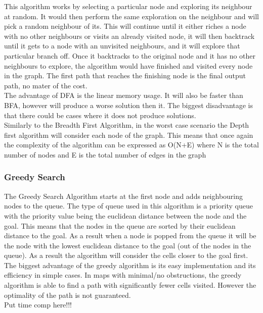 \documentclass[a4paper,12pt]{article}
\begin{document}
				This algorithm works by selecting a particular node and exploring its neighbour at random. It 
				would then perform the same exploration on the neighbour and will pick a random neighbour of its. 
				This will continue until it either riches a node with no other neighbours or visits an already 
				visited node, it will then backtrack until it gets to a node with an unvisited neighbours, and 
				it will explore that particular branch off. Once it backtracks to the original node and it has 
				no other neighbours to explore, the algorithm would have finished and visited every node in the 
				graph. The first path that reaches the finishing node is the final output path, no mater of the 
				cost. 
				\\
				The advantage of DFA is the linear memory usage. It will also be faster than BFA, however will
				produce a worse solution then it.  The biggest disadvantage is that there could be cases where 
				it does not produce solutions. 
				\\
				Similarly to the Breadth First Algorithm, in the worst case scenario the Depth first algorithm
				will consider each node of the graph. This means that once again the complexity of the algorithm
				can be expressed as O(N+E) where N is the total number of nodes and E is the total number of edges
				in the graph
			
			\subsubsection{Greedy Search}
				The Greedy Search Algorithm starts at the first node and adds neighbouring nodes to the queue. The
				type of queue used in this algorithm is a priority queue with the priority value being the euclidean
				distance between the node and the goal. This means that the nodes in the queue are sorted by their
				euclidean distance to the goal. As a result when a node is popped from the queue it will be the node
				with the lowest euclidean distance to the goal (out of the nodes in the queue). As a result the algorithm
				will consider the cells closer to the goal first.
				\\
				The biggest advantage of the greedy algorithm is its easy implementation and its efficiency in simple
				cases. In maps with minimal/no obstructions, the greedy algorithm is able to find a path with significantly
				fewer cells visited. However the optimality of the path is not guaranteed.
				\\
				Put time comp here!!!
\end{document}
